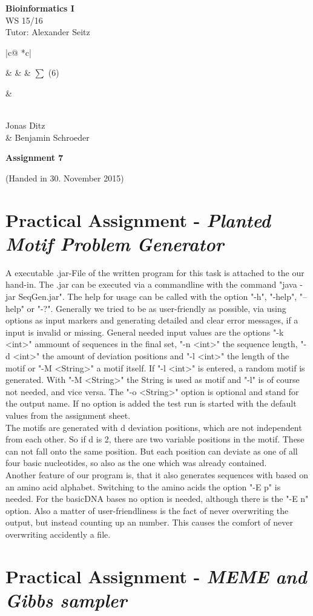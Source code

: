 \documentclass[%
   10pt,              %
   nenglish,           %
   a4paper,           %
   DIV11,             %
]{scrartcl}%
\makeatletter
\def\header#1#2#3#4#5#6#7{\pagestyle{empty}
\noindent
\begin{minipage}[t]{0.6\textwidth}
\begin{flushleft}
\textbf{#4}\\%
#6\\%
Tutor: #2  %
\end{flushleft}
\end{minipage}
\begin{minipage}[t]{0.4\textwidth}
\begin{flushright}
\points{#7}%
\vspace*{0.2cm}
#5%
\end{flushright}
\end{minipage}

\begin{center}
{\Large\textbf{ Assignment #1}} %

{(Handed in #3)} %
\end{center}
}
\newenvironment{vartab}[1]
{
    \begin{tabular}{ |c@{} *{#1}{c|} } %
}{
    \end{tabular}
}
\newcommand{\myformat}[1]{& #1}
\newcommand{\numbers}[1]{
  \newcounter{ctra}
\setcounter{ctra}{1}
\whiledo {\value{ctra} < #1}%
{%
  \myformat{\thectra}
  \stepcounter{ctra}%
}
\myformat{\thectra}
}
\newcommand{\emptyLine}[1]{
  \newcounter{ctra1}
\setcounter{ctra}{1}
\whiledo {\value{ctra1} < #1}%
{%
  \myformat{\hspace*{0.5cm}}
  \stepcounter{ctra1}%
}
}
\newcommand{\points}[1]{
\newcounter{colmns}
\setcounter{colmns}{#1}
\stepcounter{colmns}
  \begin{vartab}{\thecolmns}
    \numbers{#1} & $\sum$ (6)\\\hline   %
    \emptyLine{\thecolmns}\\
  \end{vartab}
}
\makeatother
\begin{document}
\header{7}{Alexander Seitz}{30. November 2015}{Bioinformatics I}{\\Jonas Ditz \\\& Benjamin Schroeder}{WS 15/16}{2}

\section*{Practical Assignment - \textsl{Planted Motif Problem Generator}}
A executable .jar-File of the written program for this task is attached to the our hand-in. The .jar can be executed via a commandline with the command "java -jar SeqGen.jar". The help for usage can be called with the option "-h", "-help", "--help" or "-?". Generally we tried to be as user-friendly as possible, via using options as input markers and generating detailed and clear error messages, if a input is invalid or missing. General needed input values are the options "-k <int>" ammount of sequences in the final set, "-n <int>" the sequence length, "-d <int>" the amount of deviation positions and "-l <int>" the length of the motif  or "-M <String>" a motif itself. If "-l <int>" is entered, a random motif is generated. With "-M <String>" the String is used as motif and "-l" is of course not needed, and vice versa. The "-o <String>" option is optional and stand for the output name. If no option is added the test run is started with the default values from the assignment sheet.\\
 The motifs are generated with d deviation positions, which are not independent from each other. So if d is 2, there are two variable positions in the motif. These can not fall onto the same position. But each position can deviate as one of all four basic nucleotides, so also as the one which was already contained.\\
 Another feature of our program is, that it also generates sequences with based on an amino acid alphabet. Switching to the amino acids the option "-E p" is needed. For the basicDNA bases no option is needed, although there is the "-E n" option. Also a matter of user-friendliness is the fact of never overwriting the output, but instead counting up an number. This causes the comfort of never overwriting accidently a file.

\section*{Practical Assignment - \textsl{MEME and Gibbs sampler}}
\end{document}
